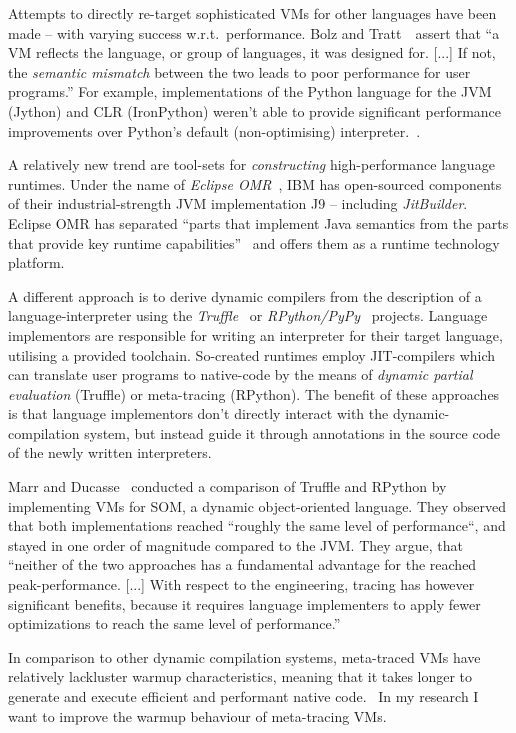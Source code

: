 Attempts to directly re-target sophisticated VMs for other languages have been
made -- with varying success w.r.t.~performance. Bolz and
Tratt~\cite{bolz14impact}~assert that ``a VM reflects the language, or group of
languages, it was designed for. [...] If not, the \emph{semantic mismatch}
between the two leads to poor performance for user programs.'' For example,
implementations of the Python language for the JVM (Jython) and CLR (IronPython)
weren't able to provide significant performance improvements over Python's
default (non-optimising) interpreter.~\cite{bolz14impact}.

A relatively new trend are tool-sets for \emph{constructing} high-performance
language runtimes. Under the name of \emph{Eclipse
OMR}~\cite{gaudet2016rebuilding}, IBM has open-sourced components of their
industrial-strength JVM implementation J9 -- including \emph{JitBuilder}.
Eclipse OMR has separated ``parts that implement Java semantics from the parts
that provide key runtime capabilities''~\cite{eclipseOMR} and offers them as a
runtime technology platform.

A different approach is to derive dynamic compilers from the description of a
language-interpreter using the
\emph{Truffle}~\cite{wurthinger2013one} or
\emph{RPython/PyPy}~\cite{bolz2009tracing} projects. Language implementors are
responsible for writing an interpreter for their target language, utilising a
provided toolchain. So-created runtimes employ JIT-compilers which can translate
user programs to native-code by the means of \emph{dynamic partial evaluation}
(Truffle) or meta-tracing (RPython). The benefit of these approaches is that
language implementors don't directly interact with the dynamic-compilation
system, but instead guide it through annotations in the source code of the
newly written interpreters.

Marr and Ducasse~\cite{marr2015tracing} conducted a  comparison of Truffle and
RPython by implementing VMs for SOM, a dynamic object-oriented language. They
observed that both implementations reached ``roughly the same level of
performance``, and stayed in one order of magnitude compared to the JVM. They
argue, that ``neither of the two approaches has a fundamental advantage for the
reached peak-performance. [...] With respect to the engineering, tracing has
however significant benefits, because it requires language implementers to apply
fewer optimizations to reach the same level of performance.''

In comparison to other dynamic compilation systems, meta-traced VMs have
relatively lackluster warmup characteristics, meaning that it takes longer to
generate and execute efficient and performant native
code.~\cite{barrett2016virtual} In my research I want to improve the warmup
behaviour of meta-tracing VMs.


